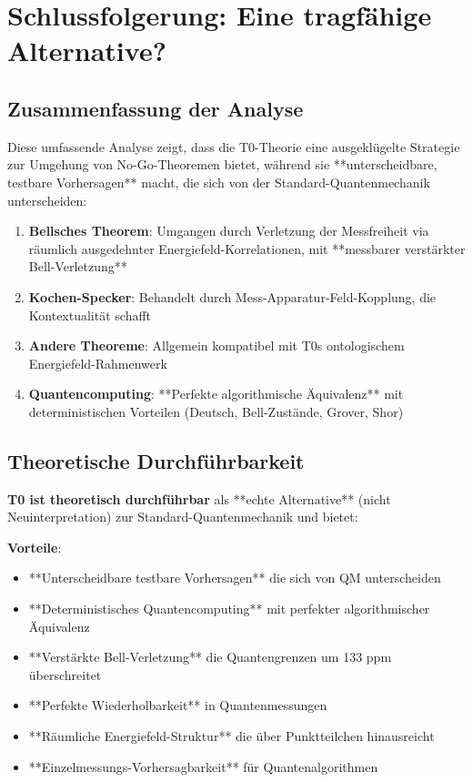 \documentclass[12pt,a4paper]{article}
\begin{document}
	\section{Schlussfolgerung: Eine tragfähige Alternative?}
	
	\subsection{Zusammenfassung der Analyse}
	
	Diese umfassende Analyse zeigt, dass die T0-Theorie eine ausgeklügelte Strategie zur Umgehung von No-Go-Theoremen bietet, während sie **unterscheidbare, testbare Vorhersagen** macht, die sich von der Standard-Quantenmechanik unterscheiden:
	
	\begin{enumerate}
		\item \textbf{Bellsches Theorem}: Umgangen durch Verletzung der Messfreiheit via räumlich ausgedehnter Energiefeld-Korrelationen, mit **messbarer verstärkter Bell-Verletzung**
		\item \textbf{Kochen-Specker}: Behandelt durch Mess-Apparatur-Feld-Kopplung, die Kontextualität schafft
		\item \textbf{Andere Theoreme}: Allgemein kompatibel mit T0s ontologischem Energiefeld-Rahmenwerk
		\item \textbf{Quantencomputing}: **Perfekte algorithmische Äquivalenz** mit deterministischen Vorteilen (Deutsch, Bell-Zustände, Grover, Shor)
	\end{enumerate}
	
	\subsection{Theoretische Durchführbarkeit}
	
	\textbf{T0 ist theoretisch durchführbar} als **echte Alternative** (nicht Neuinterpretation) zur Standard-Quantenmechanik und bietet:
	
	\textbf{Vorteile}:
	\begin{itemize}
		\item **Unterscheidbare testbare Vorhersagen** die sich von QM unterscheiden
		\item **Deterministisches Quantencomputing** mit perfekter algorithmischer Äquivalenz
		\item **Verstärkte Bell-Verletzung** die Quantengrenzen um 133 ppm überschreitet
		\item **Perfekte Wiederholbarkeit** in Quantenmessungen
		\item **Räumliche Energiefeld-Struktur** die über Punktteilchen hinausreicht
		\item **Einzelmessungs-Vorhersagbarkeit** für Quantenalgorithmen
	\end{itemize}
	
\end{document}
